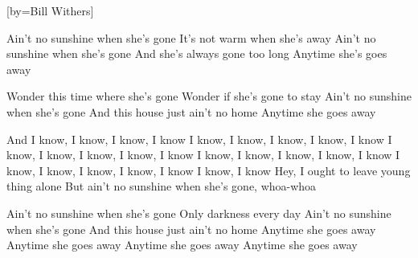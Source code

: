 [by={Bill Withers}]


  \beginverse
  Ain't no sunshine when she's gone
  It's not warm when she's away
  Ain't no sunshine when she's gone
  And she's always gone too long
  Anytime she's goes away
  \endverse

  \beginverse
  Wonder this time where she's gone
  Wonder if she's gone to stay
  Ain't no sunshine when she's gone
  And this house just ain't no home
  Anytime she goes away
  \endverse

  \beginchorus
  And I know, I know, I know, I know
  I know, I know, I know, I know, I know
  I know, I know, I know, I know, I know
  I know, I know, I know, I know, I know
  I know, I know, I know, I know, I know
  I know, I know
  Hey, I ought to leave young thing alone
  But ain't no sunshine when she's gone, whoa-whoa
  \endchorus

  \beginverse
  Ain't no sunshine when she's gone
  Only darkness every day
  Ain't no sunshine when she's gone
  And this house just ain't no home
  Anytime she goes away
  Anytime she goes away
  Anytime she goes away
  Anytime she goes away
  \endverse

\endsong
